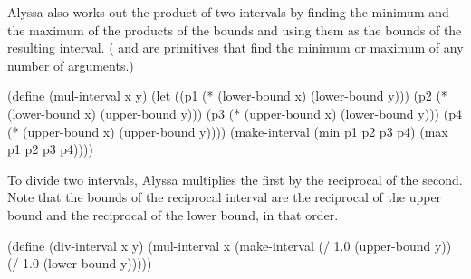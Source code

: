 \noindent
Alyssa also works out the product of two intervals by finding the minimum and
the maximum of the products of the bounds and using them as the bounds of the
resulting interval.  ( and  are primitives that find the
minimum or maximum of any number of arguments.)

\begin{codeBlock}
(define (mul-interval x y)
  (let ((p1 (* (lower-bound x) (lower-bound y)))
        (p2 (* (lower-bound x) (upper-bound y)))
        (p3 (* (upper-bound x) (lower-bound y)))
        (p4 (* (upper-bound x) (upper-bound y))))
    (make-interval (min p1 p2 p3 p4)
                   (max p1 p2 p3 p4))))
\end{codeBlock}

\noindent
To divide two intervals, Alyssa multiplies the first by the reciprocal of the
second.  Note that the bounds of the reciprocal interval are the reciprocal of
the upper bound and the reciprocal of the lower bound, in that order.

\begin{codeBlock}
(define (div-interval x y)
  (mul-interval
   x
   (make-interval (/ 1.0 (upper-bound y))
                  (/ 1.0 (lower-bound y)))))
\end{codeBlock}

